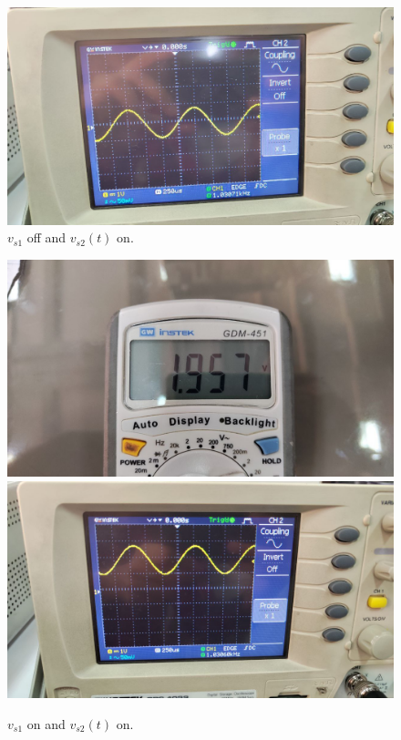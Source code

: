 \documentclass[11pt]{article}
\begin{document}
\begin{question}
\begin{subquestion}
{\begin{figure}[H]
                \includegraphics[scale=0.1,angle=0]{Fig/10.jpeg}
                \caption{$v_{s1}$ off and $v_{s2}(t)$ on.}
            \end{figure}
            \begin{figure}[H]
                \centering
                \includegraphics[scale=0.1,angle=0]{Fig/8.jpeg}
                \includegraphics[scale=0.1,angle=0]{Fig/11.jpeg}
                \caption{$v_{s1}$ on and $v_{s2}(t)$ on.}
            \end{figure}

}
\end{subquestion}
\end{question}
\end{document}
